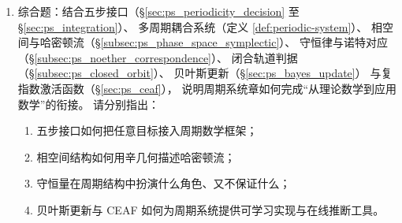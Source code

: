 \begin{enumerate}[leftmargin=3em, label=\textbf{题 \arabic*}]
    \item 综合题：结合五步接口（\S\ref{sec:ps_periodicity_decision} 至 \S\ref{sec:ps_integration}）、
    多周期耦合系统（定义 \ref{def:periodic-system}）、
    相空间与哈密顿流（\S\ref{subsec:ps_phase_space_symplectic}）、
    守恒律与诺特对应（\S\ref{subsec:ps_noether_correspondence}）、
    闭合轨道判据（\S\ref{subsec:ps_closed_orbit}）、
    贝叶斯更新（\S\ref{sec:ps_bayes_update}）
    与复指数激活函数（\S\ref{sec:ps_ceaf}），
    说明周期系统章如何完成“从理论数学到应用数学”的衔接。
    请分别指出：
    \begin{enumerate}[label=(\roman*)]
        \item 五步接口如何把任意目标接入周期数学框架；
        \item 相空间结构如何用辛几何描述哈密顿流；
        \item 守恒量在周期结构中扮演什么角色、又不保证什么；
        \item 贝叶斯更新与 CEAF 如何为周期系统提供可学习实现与在线推断工具。
    \end{enumerate}
\end{enumerate}


